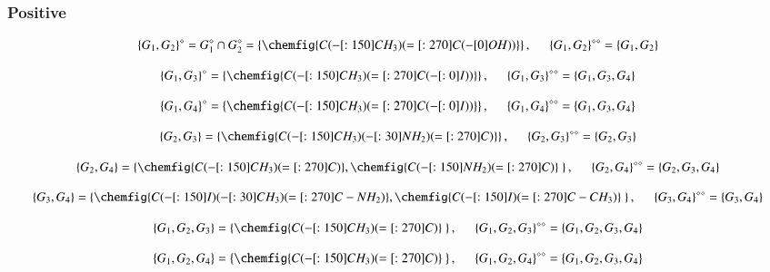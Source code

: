 \documentclass[12pt]{report}
\begin{document}
\begin{problem}{}
\begin{figure}[H]
\begin{tikzpicture}[x=0.75pt,y=0.75pt,yscale=-1,xscale=1]
\end{tikzpicture}
    \end{figure}
\end{problem}

\begin{solution}
  \subsubsection*{Positive}
    \[
        \left\{ G_1, G_2 \right\}^\diamond = G_1^\diamond \cap G_2^\diamond = \left\{\chemfig{C(-[:150]CH_3)(=[:270]C(-[0]OH))} \right\}, \hspace*{0.5cm} \left\{G_1, G_2\right\}^{\diamond\diamond} = \left\{G_1, G_2\right\}
    \]

    \[
        \left\{G_1, G_3\right\}^\diamond = \left\{\chemfig{C(-[:150]CH_3)(=[:270]C(-[:0]I))}\right\}, \hspace*{0.5cm} \left\{G_1, G_3\right\}^{\diamond\diamond} = \left\{G_1, G_3, G_4\right\}
    \]

    \[
        \left\{G_1, G_4\right\}^\diamond = \left\{\chemfig{C(-[:150]CH_3)(=[:270]C(-[:0]I))}\right\}, \hspace*{0.5cm} \left\{G_1, G_4\right\}^{\diamond\diamond} = \left\{G_1, G_3, G_4\right\}
    \]

    \[
        \left\{G_2, G_3\right\} = \left\{\chemfig{C(-[:150]CH_3)(-[:30]NH_2)(=[:270]C)}\right\}, \hspace*{0.5cm} \left\{G_2, G_3\right\}^{\diamond\diamond} = \left\{ G_2, G_3\right\}
    \]
    

    \[  
      \left\{G_2, G_4\right\} = \left\{\chemfig{C(-[:150]CH_3)(=[:270]C)}, \chemfig{C(-[:150]NH_2)(=[:270]C)}\ \right\}, \hspace*{0.5cm} \left\{G_2, G_4\right\}^{\diamond\diamond} = \left\{ G_2, G_3, G_4\right\}
    \]

    \[
      \left\{G_3, G_4\right\} = \left\{\chemfig{C(-[:150]I)(-[:30]CH_3)(=[:270]C -NH_2)}, \chemfig{C(-[:150]I)(=[:270]C-CH_3)}\ \right\}, \hspace*{0.5cm} \left\{G_3, G_4\right\}^{\diamond\diamond} = \left\{ G_3, G_4\right\}
    \]

    \[
      \left\{G_1, G_2, G_3\right\} = \left\{\chemfig{C(-[:150]CH_3)(=[:270]C)}\ \right\}, \hspace*{0.5cm} \left\{G_1, G_2, G_3\right\}^{\diamond\diamond} = \left\{G_1, G_2, G_3, G_4\right\}
    \]

    \[
      \left\{G_1, G_2, G_4\right\} = \left\{\chemfig{C(-[:150]CH_3)(=[:270]C)}\ \right\}, \hspace*{0.5cm} \left\{G_1, G_2, G_4\right\}^{\diamond\diamond} = \left\{G_1, G_2, G_3, G_4\right\}
    \]


\end{solution}
\end{document}
